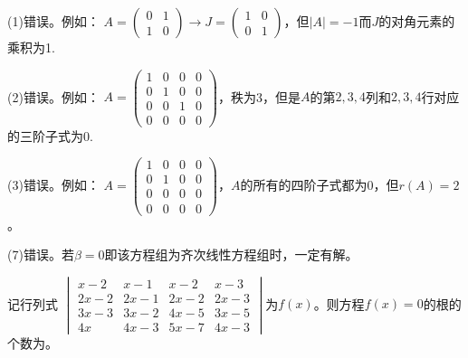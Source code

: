 \documentclass[a4paper]{report}
\begin{document}
\begin{jie}
(1)错误。例如：
$A=
\begin{pmatrix}
0&1\\
1&0
\end{pmatrix}\rightarrow J=\begin{pmatrix}
1&0\\
0&1
\end{pmatrix}
$，但$|A|=-1$而$J$的对角元素的乘积为1.

(2)错误。例如：
$A=
\begin{pmatrix}
1&0&0&0\\
0&1&0&0\\
0&0&1&0\\
0&0&0&0
\end{pmatrix}
$，秩为3，但是$A$的第$2,3,4$列和$2,3,4$行对应的三阶子式为0.

(3)错误。例如：
$A=
\begin{pmatrix}
1&0&0&0\\
0&1&0&0\\
0&0&0&0\\
0&0&0&0
\end{pmatrix}
$，$A$的所有的四阶子式都为0，但$r(A)=2$。

(7)错误。若$\beta=0$即该方程组为齐次线性方程组时，一定有解。
\end{jie}

\EX 记行列式
$
\begin{vmatrix}
x-2&x-1&x-2&x-3\\
2x-2&2x-1&2x-2&2x-3\\
3x-3&3x-2&4x-5&3x-5\\
4x&4x-3&5x-7&4x-3
\end{vmatrix}
$为$f(x)$。则方程$f(x)=0$的根的个数为\underline{\hphantom{~~~~~~~~}}。
\end{document}

